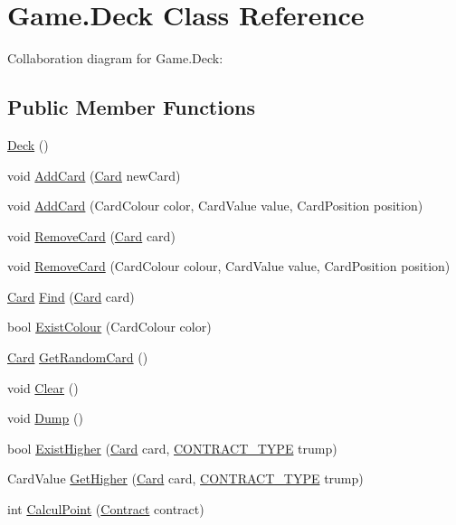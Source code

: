 \hypertarget{class_game_1_1_deck}{}\section{Game.\+Deck Class Reference}
\label{class_game_1_1_deck}


Collaboration diagram for Game.\+Deck\+:
\subsection*{Public Member Functions}
\begin{DoxyCompactItemize}
\item 
\hyperlink{class_game_1_1_deck_a977147d53a1be6b09363e38488937c14}{Deck} ()
\item 
void \hyperlink{class_game_1_1_deck_a905f11ad54ca87390a643a9b78e90e3b}{Add\+Card} (\hyperlink{class_game_1_1_card}{Card} new\+Card)
\item 
void \hyperlink{class_game_1_1_deck_a0e9186cc809c646aa1ef5ad38f684b91}{Add\+Card} (Card\+Colour color, Card\+Value value, Card\+Position position)
\item 
void \hyperlink{class_game_1_1_deck_ad860d1e5b25771143334ac5abf6a82ab}{Remove\+Card} (\hyperlink{class_game_1_1_card}{Card} card)
\item 
void \hyperlink{class_game_1_1_deck_a025b050df3a0ed5018739552b0a84c24}{Remove\+Card} (Card\+Colour colour, Card\+Value value, Card\+Position position)
\item 
\hyperlink{class_game_1_1_card}{Card} \hyperlink{class_game_1_1_deck_ae871b4e89aa2cb118bf33afd885a3e4c}{Find} (\hyperlink{class_game_1_1_card}{Card} card)
\item 
bool \hyperlink{class_game_1_1_deck_afa33057f343a0c812d061c7b30895727}{Exist\+Colour} (Card\+Colour color)
\item 
\hyperlink{class_game_1_1_card}{Card} \hyperlink{class_game_1_1_deck_a7178873941924addbde9c150bb253c5b}{Get\+Random\+Card} ()
\item 
void \hyperlink{class_game_1_1_deck_a62bbbd7a4de1775ff7fe3c30e9a70ea7}{Clear} ()
\item 
void \hyperlink{class_game_1_1_deck_a613f5cafa2c403afc6b91247ded472f4}{Dump} ()
\item 
bool \hyperlink{class_game_1_1_deck_ac66b46d86ce2f0db905bd2c195fc36f5}{Exist\+Higher} (\hyperlink{class_game_1_1_card}{Card} card, \hyperlink{namespace_game_ae93b4df2175d9820e5d19dc1ab708e7e}{C\+O\+N\+T\+R\+A\+C\+T\+\_\+\+T\+Y\+PE} trump)
\item 
Card\+Value \hyperlink{class_game_1_1_deck_a7c461ece0d32eccaaa1c3047a24a214e}{Get\+Higher} (\hyperlink{class_game_1_1_card}{Card} card, \hyperlink{namespace_game_ae93b4df2175d9820e5d19dc1ab708e7e}{C\+O\+N\+T\+R\+A\+C\+T\+\_\+\+T\+Y\+PE} trump)
\item 
int \hyperlink{class_game_1_1_deck_a2a63e65747fc5d221b841be0243cc8e0}{Calcul\+Point} (\hyperlink{class_game_1_1_contract}{Contract} contract)
\end{DoxyCompactItemize}
